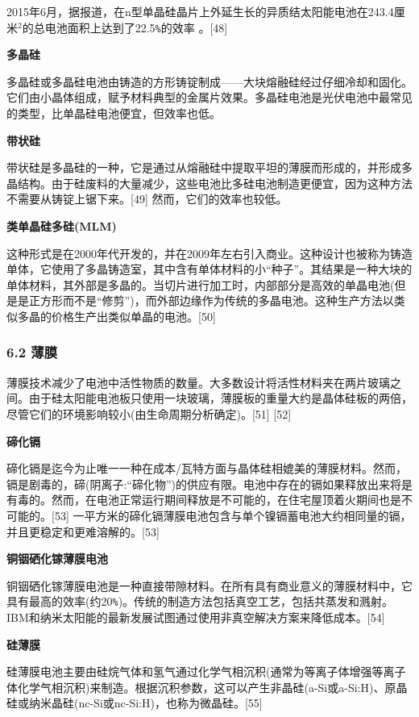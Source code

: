 2015年6月，据报道，在n型单晶硅晶片上外延生长的异质结太阳能电池在243.4厘米${^2}$的总电池面积上达到了22.5\verb|%|的效率 。[48]

\textbf{多晶硅}

多晶硅或多晶硅电池由铸造的方形铸锭制成——大块熔融硅经过仔细冷却和固化。它们由小晶体组成，赋予材料典型的金属片效果。多晶硅电池是光伏电池中最常见的类型，比单晶硅电池便宜，但效率也低。

\textbf{带状硅}

带状硅是多晶硅的一种，它是通过从熔融硅中提取平坦的薄膜而形成的，并形成多晶结构。由于硅废料的大量减少，这些电池比多硅电池制造更便宜，因为这种方法不需要从铸锭上锯下来。[49] 然而，它们的效率也较低。

\textbf{类单晶硅多硅(MLM)}

这种形式是在2000年代开发的，并在2009年左右引入商业。这种设计也被称为铸造单体，它使用了多晶铸造室，其中含有单体材料的小“种子”。其结果是一种大块的单体材料，其外部是多晶的。当切片进行加工时，内部部分是高效的单晶电池(但是是正方形而不是“修剪”)，而外部边缘作为传统的多晶电池。这种生产方法以类似多晶的价格生产出类似单晶的电池。[50]

\subsubsection{6.2 薄膜}

薄膜技术减少了电池中活性物质的数量。大多数设计将活性材料夹在两片玻璃之间。由于硅太阳能电池板只使用一块玻璃，薄膜板的重量大约是晶体硅板的两倍，尽管它们的环境影响较小(由生命周期分析确定)。[51] [52]

\textbf{碲化镉}

碲化镉是迄今为止唯一一种在成本/瓦特方面与晶体硅相媲美的薄膜材料。然而，镉是剧毒的，碲(阴离子:“碲化物”)的供应有限。电池中存在的镉如果释放出来将是有毒的。然而，在电池正常运行期间释放是不可能的，在住宅屋顶着火期间也是不可能的。[53] 一平方米的碲化镉薄膜电池包含与单个镍镉蓄电池大约相同量的镉，并且更稳定和更难溶解的。[53]

\textbf{铜铟硒化镓薄膜电池}

铜铟硒化镓薄膜电池是一种直接带隙材料。在所有具有商业意义的薄膜材料中，它具有最高的效率(约20\verb|%|)。传统的制造方法包括真空工艺，包括共蒸发和溅射。IBM和纳米太阳能的最新发展试图通过使用非真空解决方案来降低成本。[54]

\textbf{硅薄膜}

硅薄膜电池主要由硅烷气体和氢气通过化学气相沉积(通常为等离子体增强等离子体化学气相沉积)来制造。根据沉积参数，这可以产生非晶硅(a-Si或a-Si:H)、原晶硅或纳米晶硅(nc-Si或nc-Si:H)，也称为微晶硅。[55]

